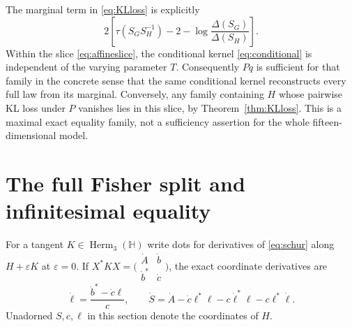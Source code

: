 \documentclass[11pt,a4paper]{article}
\numberwithin{equation}{section}
\theoremstyle{definition}
\theoremstyle{remark}
\newcommand{\HH}{\mathbb H}
\newcommand{\Herm}{\operatorname{Herm}}
\newcommand{\Ntwo}{\Delta}
\newcommand{\rtr}{\tau}
\begin{document}
The marginal term in \eqref{eq:KLloss} is explicitly
\[
2\left[\rtr(S_GS_H^{-1})-2-
\log\frac{\Ntwo(S_G)}{\Ntwo(S_H)}\right].
\]
Within the slice \eqref{eq:affineslice}, the conditional kernel
\eqref{eq:conditional} is independent of the varying parameter $T$.
Consequently $Pq$ is sufficient for that family in the concrete sense
that the same conditional kernel reconstructs every full law from its
marginal. Conversely, any family containing $H$ whose pairwise KL loss
under $P$ vanishes lies in this slice, by Theorem~\ref{thm:KLloss}.
This is a maximal exact equality family, not a sufficiency assertion
for the whole fifteen-dimensional model.

\section{The full Fisher split and infinitesimal equality}\label{sec:fishersplit}

For a tangent $K\in\Herm_3(\HH)$ write dots for derivatives of
\eqref{eq:schur} along $H+\varepsilon K$ at $\varepsilon=0$.
If $X^*KX=\bigl(\begin{smallmatrix}\dot A&\dot b\\\dot b^*&\dot c\end{smallmatrix}\bigr)$,
the exact coordinate derivatives are
\begin{equation}\label{eq:tangents}
\dot\ell=\frac{\dot b^*-\dot c\ell}{c},\qquad
\dot S=\dot A-\dot c\ell^*\ell
 -c\dot\ell^*\ell-c\ell^*\dot\ell.
\end{equation}
Unadorned $S,c,\ell$ in this section denote the coordinates of $H$.
\end{document}
